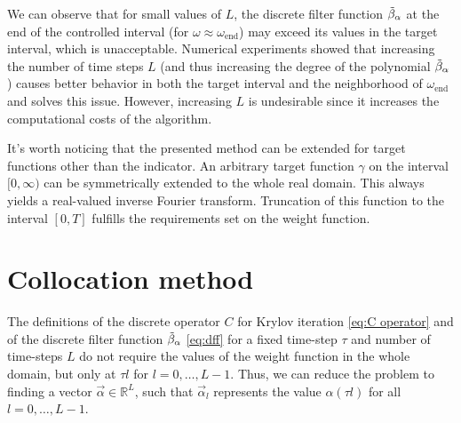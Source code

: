 \documentclass[a4paper,11pt,bibliography=totoc,listof=totoc,headinclude=true,cleardoublepage=empty,oneside]{scrbook}
\newcommand{\R}{\mathbb{R}}
\newcommand{\dff}{\Tilde{\beta}_\alpha}
\newcommand{\e}{\mathrm{end}}
\begin{document}

We can observe that for small values of $L$, the discrete filter function $\dff$ at the end of the controlled interval (for $\omega \approx \omega_\e$) may exceed its values in the target interval, which is unacceptable. Numerical experiments showed that increasing the number of time steps $L$ (and thus increasing the degree of the polynomial $\dff$) causes better behavior in both the target interval and the neighborhood of $\omega_\e$ and solves this issue. However, increasing $L$ is undesirable since it increases the computational costs of the algorithm.

It's worth noticing that the presented method can be extended for target functions other than the indicator. An arbitrary target function $\gamma$ on the interval $[0, \infty)$ can be symmetrically extended to the whole real domain. This always yields a real-valued inverse Fourier transform. Truncation of this function to the interval $[0, T]$ fulfills the requirements set on the weight function.

\section{Collocation method}\label{section:collocation}
The definitions of the discrete operator $C$ for Krylov iteration \eqref{eq:C operator} and of the discrete filter function $\dff$ \eqref{eq:dff} for a fixed time-step $\tau$ and number of time-steps $L$ do not require the values of the weight function in the whole domain, but only at $\tau l$ for $l=0, \dots, L-1$. Thus, we can reduce the problem to finding a vector $\Vec{\alpha} \in \R^L$, such that $\Vec{\alpha}_l$ represents the value $\alpha(\tau l)$ for all $l=0, \dots, L-1$.
\end{document}
